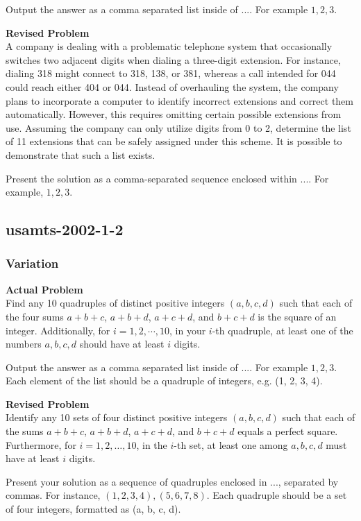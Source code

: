 Output the answer as a comma separated list inside of $\boxed{...}$. For example $\boxed{1, 2, 3}$.

\textbf{Revised Problem}\\
A company is dealing with a problematic telephone system that occasionally switches two adjacent digits when dialing a three-digit extension. For instance, dialing 318 might connect to 318, 138, or 381, whereas a call intended for 044 could reach either 404 or 044. Instead of overhauling the system, the company plans to incorporate a computer to identify incorrect extensions and correct them automatically. However, this requires omitting certain possible extensions from use.
Assuming the company can only utilize digits from 0 to 2, determine the list of 11 extensions that can be safely assigned under this scheme.
It is possible to demonstrate that such a list exists.

Present the solution as a comma-separated sequence enclosed within $\boxed{...}$. For example, $\boxed{1, 2, 3}$.

\subsection{usamts-2002-1-2}
\subsubsection{Variation}
\textbf{Actual Problem}\\
Find any 10 quadruples of distinct positive integers $(a, b, c, d)$ such that each of the four sums $a+b+c$, $a+b+d$, $a+c+d$, and $b+c+d$ is the square of an integer.
Additionally, for $i = 1, 2, \cdots, 10$, in your $i$-th quadruple, at least one of the numbers $a, b, c, d$ should have at least $i$ digits.

Output the answer as a comma separated list inside of $\boxed{...}$. For example $\boxed{1, 2, 3}$.
Each element of the list should be a quadruple of integers, e.g. (1, 2, 3, 4).

\textbf{Revised Problem}\\
Identify any 10 sets of four distinct positive integers $(a, b, c, d)$ such that each of the sums $a+b+c$, $a+b+d$, $a+c+d$, and $b+c+d$ equals a perfect square. Furthermore, for $i = 1, 2, \ldots, 10$, in the $i$-th set, at least one among $a, b, c, d$ must have at least $i$ digits.

Present your solution as a sequence of quadruples enclosed in $\boxed{...}$, separated by commas. For instance, $\boxed{(1, 2, 3, 4), (5, 6, 7, 8)}$. Each quadruple should be a set of four integers, formatted as (a, b, c, d).

